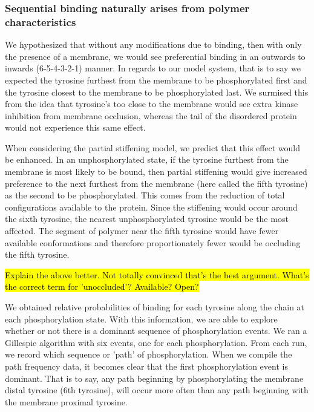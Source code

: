 \documentclass[../../AdvancementSummary.tex]{subfiles}
\begin{document}
\subsubsection{Sequential binding naturally arises from polymer characteristics}

We hypothesized that without any modifications due to binding, then with only the presence of a membrane, we would see preferential binding in an outwards to inwards (6-5-4-3-2-1) manner.  In regards to our model system, that is to say we expected the tyrosine furthest from the membrane to be phosphorylated first and the tyrosine closest to the membrane to be phosphorylated last.  We surmised this from the idea that tyrosine's too close to the membrane would see extra kinase inhibition from membrane occlusion, whereas the tail of the disordered protein would not experience this same effect. 

When considering the partial stiffening model, we predict that this effect would be enhanced.  In an unphosphorylated state, if the tyrosine furthest from the membrane is most likely to be bound, then partial stiffening would give increased preference to the next furthest from the membrane (here called the fifth tyrosine) as the second to be phosphorylated.  This comes from the reduction of total configurations available to the protein.  Since the stiffening would occur around the sixth tyrosine, the nearest unphosphorylated tyrosine would be the most affected.  The segment of polymer near the fifth tyrosine would have fewer available conformations and therefore proportionately fewer would be occluding the fifth tyrosine.

\hl{Explain the above better.  Not totally convinced that's the best argument.  What's the correct term for 'unoccluded'?  Available?  Open?}

We obtained relative probabilities of binding for each tyrosine along the chain at each phosphorylation state.  With this information, we are able to explore whether or not there is a dominant sequence of phosphorylation events. We ran a Gillespie algorithm with six events, one for each phosphorylation.  From each run, we record which sequence or 'path' of phosphorylation.  When we compile the path frequency data, it becomes clear that the first phosphorylation event is dominant.  That is to say, any path beginning by phosphorylating the membrane distal tyrosine (6th tyrosine), will occur more often than any path beginning with the membrane proximal tyrosine. 
\end{document}
